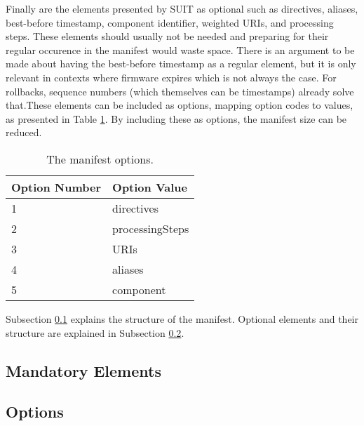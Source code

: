 \documentclass[0-thesis.tex]{subfiles}
\begin{document}
Finally are the elements presented by SUIT as optional such as directives, aliases,
best-before timestamp, component identifier, weighted URIs, and processing steps. These
elements should usually not be needed and preparing for their regular occurence in the
manifest would waste space. There is an argument to be made about having the best-before
timestamp as a regular element, but it is only relevant in contexts where firmware expires
which is not always the case. For rollbacks, sequence numbers (which themselves can be
timestamps) already solve that.These elements can be included as options, mapping option
codes to values, as presented in Table \ref{tab:option-codes}. By including these as
options, the manifest size can be reduced.

\begin{longtable}[]{@{}ll@{}}
    \caption{The manifest options.}
    \label{tab:option-codes}\\
    \toprule
    Option Number & Option Value\tabularnewline
    \midrule
    \endhead
    1 & directives\tabularnewline
    2 & processingSteps\tabularnewline
    3 & URIs\tabularnewline
    4 & aliases\tabularnewline
    5 & component\tabularnewline
    \bottomrule
\end{longtable}
    

Subsection \ref{ssec:mandatory-elements} explains the structure of the manifest. Optional
elements and their structure are explained in Subsection \ref{ssec:options}.

\subsection{Mandatory Elements}
\label{ssec:mandatory-elements}

\subsection{Options}
\label{ssec:options}
\end{document}
